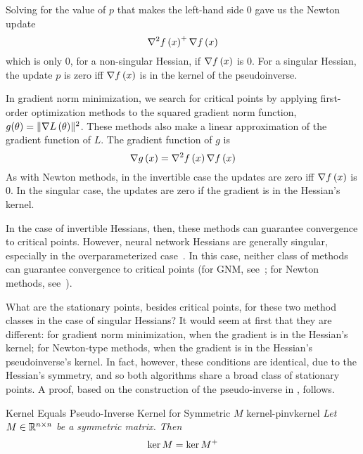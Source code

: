 \documentclass[../../thesis.tex]{subfiles}
\begin{document}
Solving for the value of $p$
that makes the left-hand side $0$
gave us the Newton update
\begin{equation}
	\nabla^2f\left(x\right)^{+}\nabla f\left(x\right)
\end{equation}
\noindent which is only $0$,
for a non-singular Hessian,
if $\nabla f\left(x\right)$ is $0$.
For a singular Hessian,
the update $p$ is zero iff $\nabla f\left(x\right)$ is
in the kernel of the pseudoinverse.

In gradient norm minimization,
we search for critical points
by applying first-order optimization methods
to the squared gradient norm function,
$g(\theta) = \lVert\nabla L\left(\theta\right)\rVert^2$.
These methods also make a linear approximation
of the gradient function of $L$.
The gradient function of $g$ is
\begin{equation}
	\nabla g\left(x\right) = \nabla^2f\left(x\right)\nabla f\left(x\right)
\end{equation}
\noindent As with Newton methods, in the invertible case
the updates are zero iff $\nabla f\left(x\right)$ is 0.
In the singular case,
the updates are zero if the gradient is in the Hessian's kernel.

In the case of invertible Hessians, then,
these methods can guarantee convergence to critical points.
However, neural network Hessians are generally singular,
especially in the overparameterized case~\cite{sagun2017,ghorbani2019}.
In this case,
neither class of methods can guarantee
convergence to critical points
(for GNM, see~\cite{doye2002};
for Newton methods, see~\cite{powell1970,griewank1983}).

What are the stationary points, besides critical points,
for these two method classes in the case of singular Hessians?
It would seem at first that they are different:
for gradient norm minimization,
when the gradient is in the Hessian's kernel;
for Newton-type methods,
when the gradient is in the Hessian's pseudoinverse's kernel.
In fact, however,
these conditions are identical, due to the Hessian's symmetry,
and so both algorithms share a broad class of stationary points.
A proof, based on the construction of the pseudo-inverse in
, follows.

\begin{theorem}{Kernel Equals Pseudo-Inverse Kernel for Symmetric $M$}%
{kernel-pinvkernel}
	\emph{%
		Let $M\in\mathbb{R}^{n \times n}$ be a symmetric matrix.
		Then
		\begin{equation}
			\ker M  = \ker M^{+}
		\end{equation}
	}
\end{theorem}
\end{document}
